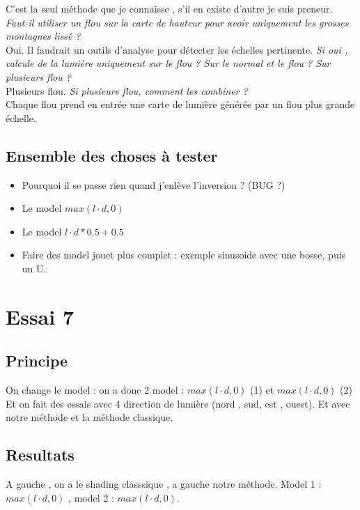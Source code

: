 \documentclass[a4paper]{article}
\begin{document}
C'est la seul méthode que je connaisse , s'il en existe d'autre je suis preneur. 
\textit{ Faut-il utiliser un flou sur la carte de hauteur pour avoir uniquement les grosses montagnes lissé ?}\\
Oui. Il faudrait un outils d'analyse pour détecter les échelles pertinente. 
\textit{ Si oui , calcule de la lumière uniquement sur le flou ? Sur le normal et le flou ? Sur plusieurs flou ? }\\
Plusieurs flou.
\textit{ Si plusieurs flou, comment les combiner ? }\\
Chaque flou prend en entrée une carte de lumière générée par un flou plus grande échelle.



\subsection{Ensemble des choses à tester}
\begin{itemize}
\item Pourquoi il se passe rien quand j'enlève l'inversion ? (BUG ?)
\item Le model  $max(l\cdot d, 0)$
\item Le model  $ l\cdot d*0.5 + 0.5$
\item Faire des model jouet plus complet : exemple sinusoide avec une bosse, puis un U. 




\end{itemize}


\section{Essai 7}
\subsection{Principe}
On change le model : on a donc 2 model : $max(l\cdot d, 0)$ (1) et  $max(l\cdot d, 0)$ (2) 
Et on fait des essais avec 4 direction de lumière (nord , sud, est , ouest). Et avec notre méthode et la méthode classique. 

\subsection{Resultats}
A gauche , on a le shading classsique , a gauche notre méthode. 
Model 1 :  $max(l\cdot d, 0)$ , model 2 :  $max(l\cdot d, 0)$.
\end{document}
